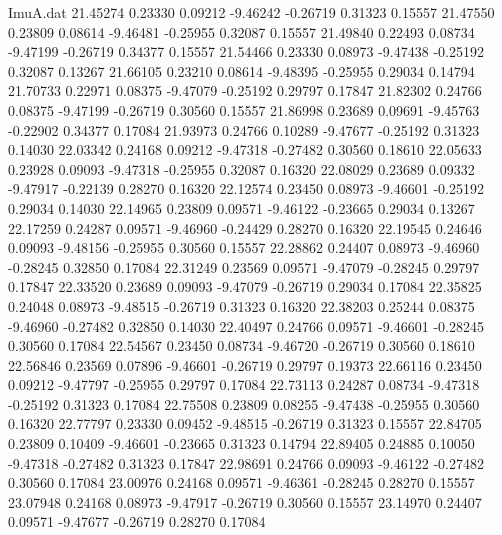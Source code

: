 \begin{filecontents}{ImuA.dat}
  21.45274    0.23330    0.09212   -9.46242   -0.26719    0.31323    0.15557
  21.47550    0.23809    0.08614   -9.46481   -0.25955    0.32087    0.15557
  21.49840    0.22493    0.08734   -9.47199   -0.26719    0.34377    0.15557
  21.54466    0.23330    0.08973   -9.47438   -0.25192    0.32087    0.13267
  21.66105    0.23210    0.08614   -9.48395   -0.25955    0.29034    0.14794
  21.70733    0.22971    0.08375   -9.47079   -0.25192    0.29797    0.17847
  21.82302    0.24766    0.08375   -9.47199   -0.26719    0.30560    0.15557
  21.86998    0.23689    0.09691   -9.45763   -0.22902    0.34377    0.17084
  21.93973    0.24766    0.10289   -9.47677   -0.25192    0.31323    0.14030
  22.03342    0.24168    0.09212   -9.47318   -0.27482    0.30560    0.18610
  22.05633    0.23928    0.09093   -9.47318   -0.25955    0.32087    0.16320
  22.08029    0.23689    0.09332   -9.47917   -0.22139    0.28270    0.16320
  22.12574    0.23450    0.08973   -9.46601   -0.25192    0.29034    0.14030
  22.14965    0.23809    0.09571   -9.46122   -0.23665    0.29034    0.13267
  22.17259    0.24287    0.09571   -9.46960   -0.24429    0.28270    0.16320
  22.19545    0.24646    0.09093   -9.48156   -0.25955    0.30560    0.15557
  22.28862    0.24407    0.08973   -9.46960   -0.28245    0.32850    0.17084
  22.31249    0.23569    0.09571   -9.47079   -0.28245    0.29797    0.17847
  22.33520    0.23689    0.09093   -9.47079   -0.26719    0.29034    0.17084
  22.35825    0.24048    0.08973   -9.48515   -0.26719    0.31323    0.16320
  22.38203    0.25244    0.08375   -9.46960   -0.27482    0.32850    0.14030
  22.40497    0.24766    0.09571   -9.46601   -0.28245    0.30560    0.17084
  22.54567    0.23450    0.08734   -9.46720   -0.26719    0.30560    0.18610
  22.56846    0.23569    0.07896   -9.46601   -0.26719    0.29797    0.19373
  22.66116    0.23450    0.09212   -9.47797   -0.25955    0.29797    0.17084
  22.73113    0.24287    0.08734   -9.47318   -0.25192    0.31323    0.17084
  22.75508    0.23809    0.08255   -9.47438   -0.25955    0.30560    0.16320
  22.77797    0.23330    0.09452   -9.48515   -0.26719    0.31323    0.15557
  22.84705    0.23809    0.10409   -9.46601   -0.23665    0.31323    0.14794
  22.89405    0.24885    0.10050   -9.47318   -0.27482    0.31323    0.17847
  22.98691    0.24766    0.09093   -9.46122   -0.27482    0.30560    0.17084
  23.00976    0.24168    0.09571   -9.46361   -0.28245    0.28270    0.15557
  23.07948    0.24168    0.08973   -9.47917   -0.26719    0.30560    0.15557
  23.14970    0.24407    0.09571   -9.47677   -0.26719    0.28270    0.17084

\end{filecontents}
